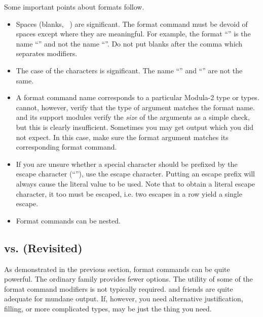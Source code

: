 Some important points about formats follow.
\begin{itemize}
\item
    Spaces (blanks, \verb*+ +) are significant.  The format
    command must be devoid of spaces except where they are meaningful.
    For example, the format ``\code{[ Card]}'' is the name 
    ``''
    and not the name ``''.   Do not put blanks after
    the comma which separates modifiers.

\item    
    The case of the characters is significant.
    The name ``'' and ``'' are not
    the same.
    
\item
    A format command name corresponds to a particular Modula-2 type or
    types.  cannot, however, verify that the type of argument
    matches the format name.   and its support modules
    verify the {\em size} of the arguments as a simple check, but this is
    clearly insufficient.  Sometimes you
    may get output which you did not expect.  In this case, make sure the
    format argument matches its corresponding format command.
\item
    If you are unsure whether a special character should be prefixed
    by the escape character (``''), use the escape character.
    Putting an escape prefix will always cause the literal value to 
    be used.  Note that to obtain a literal escape character, it too
    must be escaped, i.e. two escapes in a row yield a single escape.
    
\item
    Format commands can be nested.  
        
\end{itemize}

\subsection{ vs.  (Revisited)}

As demonstrated in the previous section, format commands can
be quite powerful.  The ordinary  family provides
fewer options.  The utility of some of the format command modifiers
is not typically required.    and friends 
are quite adequate for mundane output.  If, however, you need alternative
justification, filling, or more complicated types, 
 may be just the thing you need.

